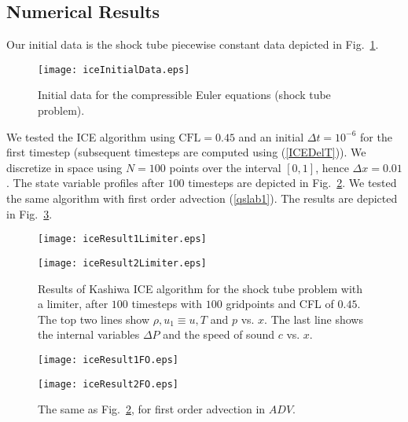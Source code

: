 \documentclass[11pt,oneside]{article}
\def \D {\Delta}
\def \cfl {\mathrm{CFL}}
\begin{document}
\subsection{Numerical Results}
Our initial data is the shock tube piecewise constant data depicted
in Fig.~\ref{ShockTubeInitialData}.
\begin{figure}[tbp]
   \centering
   \texttt{[image: iceInitialData.eps]}
   \caption{Initial data for the compressible Euler equations (shock tube
   problem).}
   \label{ShockTubeInitialData}
\end{figure}

We tested the ICE algorithm using $\cfl = 0.45$ and
an initial $\D t = 10^{-6}$ for the first timestep (subsequent timesteps
are computed using (\ref{ICEDelT})). We discretize in space using $N = 100$
points over the interval $[0,1]$, hence $\D x = 0.01$.
The state variable profiles after $100$ timesteps are depicted in
Fig.~\ref{ICEResultLimiter}. We tested the same algorithm with first order
advection (\ref{qslab1}). The results are depicted in Fig.~\ref{ICEResultFO}.
\begin{figure}[htbp]
\begin{center}
\texttt{[image: iceResult1Limiter.eps]}
\end{center}
\begin{center}
\texttt{[image: iceResult2Limiter.eps]}
\end{center}
\caption{Results of Kashiwa ICE algorithm for the shock tube problem
with a limiter,
after $100$ timesteps with $100$ gridpoints and CFL of $0.45$. The top
two lines show $\rho,u_1\equiv u, T$ and $p$ vs. $x$. The last line
shows the internal variables $\D P$ and the speed of sound $c$ vs. $x$.}
\label{ICEResultLimiter}
\end{figure}
\begin{figure}[htbp]
\begin{center}
\texttt{[image: iceResult1FO.eps]}
\end{center}
\begin{center}
\texttt{[image: iceResult2FO.eps]}
\end{center}
\caption{The same as Fig.~\ref{ICEResultLimiter}, for first order advection
in $ADV$.}
\label{ICEResultFO}
\end{figure}
\end{document}
